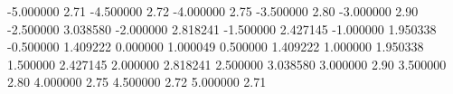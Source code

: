 %
%
-5.000000  2.71 
-4.500000  2.72 
-4.000000  2.75 
-3.500000  2.80
-3.000000  2.90 
-2.500000  3.038580 
-2.000000  2.818241 
-1.500000  2.427145 
-1.000000  1.950338 
-0.500000  1.409222 
0.000000  1.000049 
0.500000  1.409222 
1.000000  1.950338 
1.500000  2.427145 
2.000000  2.818241 
2.500000  3.038580 
3.000000  2.90 
3.500000  2.80
4.000000  2.75 
4.500000  2.72 
5.000000  2.71 
